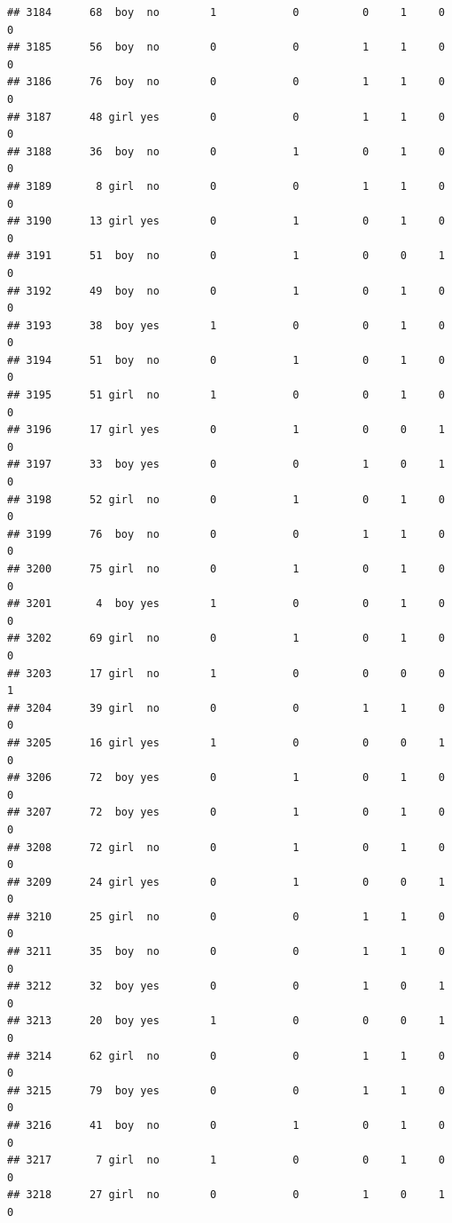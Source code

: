 \documentclass[man]{apa6}
\begin{document}
\begin{verbatim}
## 3184      68  boy  no        1            0          0     1     0     0
## 3185      56  boy  no        0            0          1     1     0     0
## 3186      76  boy  no        0            0          1     1     0     0
## 3187      48 girl yes        0            0          1     1     0     0
## 3188      36  boy  no        0            1          0     1     0     0
## 3189       8 girl  no        0            0          1     1     0     0
## 3190      13 girl yes        0            1          0     1     0     0
## 3191      51  boy  no        0            1          0     0     1     0
## 3192      49  boy  no        0            1          0     1     0     0
## 3193      38  boy yes        1            0          0     1     0     0
## 3194      51  boy  no        0            1          0     1     0     0
## 3195      51 girl  no        1            0          0     1     0     0
## 3196      17 girl yes        0            1          0     0     1     0
## 3197      33  boy yes        0            0          1     0     1     0
## 3198      52 girl  no        0            1          0     1     0     0
## 3199      76  boy  no        0            0          1     1     0     0
## 3200      75 girl  no        0            1          0     1     0     0
## 3201       4  boy yes        1            0          0     1     0     0
## 3202      69 girl  no        0            1          0     1     0     0
## 3203      17 girl  no        1            0          0     0     0     1
## 3204      39 girl  no        0            0          1     1     0     0
## 3205      16 girl yes        1            0          0     0     1     0
## 3206      72  boy yes        0            1          0     1     0     0
## 3207      72  boy yes        0            1          0     1     0     0
## 3208      72 girl  no        0            1          0     1     0     0
## 3209      24 girl yes        0            1          0     0     1     0
## 3210      25 girl  no        0            0          1     1     0     0
## 3211      35  boy  no        0            0          1     1     0     0
## 3212      32  boy yes        0            0          1     0     1     0
## 3213      20  boy yes        1            0          0     0     1     0
## 3214      62 girl  no        0            0          1     1     0     0
## 3215      79  boy yes        0            0          1     1     0     0
## 3216      41  boy  no        0            1          0     1     0     0
## 3217       7 girl  no        1            0          0     1     0     0
## 3218      27 girl  no        0            0          1     0     1     0

\end{verbatim}
\end{document}
